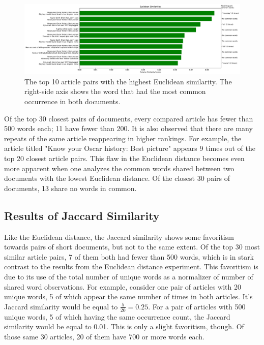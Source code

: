 \documentclass[11pt]{article}
\begin{document}
\begin{figure}[h] \label{fig:euclid}
  \centering
  \includegraphics[width=\textwidth]{figures/euclidean_most_sim}
  \caption{The top 10 article pairs with the highest Euclidean similarity.
  The right-side axis shows the word that had the most common occurrence in both documents.}
\end{figure}

Of the top 30 closest pairs of documents, every compared article has fewer than 500 words each; 11 have fewer than 200.
It is also observed that there are many repeats of the same article reappearing in higher rankings.
For example, the article titled "Know your Oscar history: Best picture" appears 9 times out of the top 20 closest article pairs.
This flaw in the Euclidean distance becomes even more apparent when one analyzes the common words shared between two documents with the lowest Euclidean distance.
Of the closest 30 pairs of documents, 13 share no words in common.

\subsection{Results of Jaccard Similarity}

Like the Euclidean distance, the Jaccard similarity shows some favoritism towards pairs of short documents, but not to the same extent.
Of the top 30 most similar article pairs, 7 of them both had fewer than 500 words, which is in stark contrast to the results from the Euclidean distance experiment.
This favoritism is due to its use of the total number of unique words as a normalizer of number of shared word observations.
For example, consider one pair of articles with 20 unique words, 5 of which appear the same number of times in both articles.
It's Jaccard similarity would be equal to $\frac{5}{20} = 0.25$.
For a pair of articles with 500 unique words, 5 of which having the same occurrence count, the Jaccard similarity would be equal to 0.01.
This is only a slight favoritism, though.
Of those same 30 articles, 20 of them have 700 or more words each.
\end{document}
